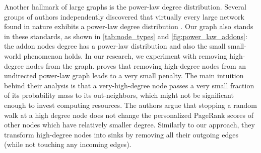 \documentclass[11pt,oneside]{book}
\begin{document}
Another hallmark of large graphs is the power-law degree distribution. Several groups of authors independently discovered that virtually every large network found in nature exhibits a power-law degree distribution \citep{albert1999internet,aiello2001random}. Our graph also stands in these standards, as shown in \autoref{tab:node_types} and \autoref{fig:power_law_addons}: the addon nodes degree has a power-law distribution and also the small small-world phenomenon holds. In our research, we experiment with removing high-degree nodes from the graph. \cite{sarkar2010tractable} proves that removing high-degree nodes from an undirected power-law graph leads to a very small penalty. The main intuition behind their analysis is that a very-high-degree node passes a very small fraction of its probability mass to its out-neighbors,
which might not be significant enough to invest computing resources. The authors argue that stopping a random walk at a high degree node does not change the personalized PageRank scores of other nodes which have relatively smaller degree. Similarly to our approach, they transform high-degree
nodes into sinks by removing all their outgoing edges (while not touching any incoming edges).
\end{document}
